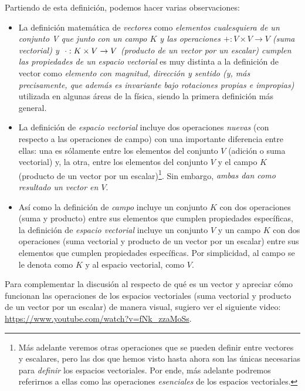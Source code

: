 \documentclass[apuntes]{subfiles}
\begin{document}
Partiendo de esta definición, podemos hacer varias observaciones:

\begin{itemize}
    \item La definición matemática de \textit{vectores} como \textit{elementos cualesquiera de un conjunto V que \textemdash junto con un campo $K$ y las operaciones $+:V\times V\to V$ (suma vectorial) y $\hspace{1mm} \cdot:K\times V\to V$ (producto de un vector por un escalar) \textemdash\hspace{0.5mm} cumplen las propiedades de un espacio vectorial} es muy distinta a la definición de vector como \textit{elemento con magnitud, dirección y sentido (y, más precisamente, que además es invariante bajo rotaciones propias e impropias)} utilizada en algunas áreas de la física, siendo la primera definición más general.
    \item La definición de \textit{espacio vectorial} incluye dos operaciones \textit{nuevas} (con respecto a las operaciones de campo) con una importante diferencia entre ellas: una es sólamente entre los elementos del conjunto $V$ (adición o suma vectorial) y, la otra, entre los elementos del conjunto $V$ y el campo $K$ (producto de un vector por un escalar)\footnote{Más adelante veremos otras operaciones que se pueden definir entre vectores y escalares, pero las dos que hemos visto hasta ahora son las únicas necesarias para \textit{definir} los espacios vectoriales. Por ende, más adelante podremos referirnos a ellas como las operaciones \emph{esenciales} de los espacios vectoriales.}. Sin embargo, \emph{ambas dan como resultado un vector en $V$}.
    \item Así como la definición de \textit{campo} incluye un conjunto $K$ con dos operaciones (suma y producto) entre sus elementos que cumplen propiedades específicas, la definición de \textit{espacio vectorial} incluye un conjunto $V$ y un campo $K$ con dos operaciones (suma vectorial y producto de un vector por un escalar) entre sus elementos que cumplen propiedades específicas. Por simplicidad, al campo se le denota como $K$ y al espacio vectorial, como $V$.
    
\end{itemize}{}

Para complementar la discusión al respecto de qué es un vector y apreciar cómo funcionan las operaciones de los espacios vectoriales (suma vectorial y producto de un vector por un escalar) de manera visual, sugiero ver el siguiente video: \url{https://www.youtube.com/watch?v=fNk_zzaMoSs}.
\end{document}
